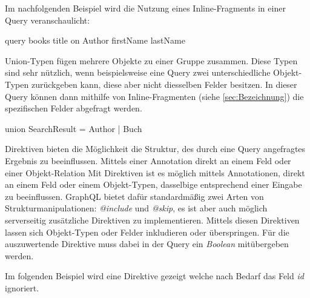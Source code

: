 Im nachfolgenden Beispiel wird die Nutzung eines Inline-Fragments in einer Query veranschaulicht:
\begin{JsCode}
query{
    books{
        title
        on Author{
            firstName
            lastName
        }
    }
}
\end{JsCode}

Union-Typen fügen mehrere Objekte zu einer Gruppe zusammen.
Diese Typen sind sehr nützlich, wenn beispielsweise eine Query zwei unterschiedliche Objekt-Typen zurückgeben kann, diese aber nicht diesselben Felder besitzen.
In dieser Query können dann mithilfe von Inline-Fragmenten (siehe \ref{sec:Bezeichnung}) die spezifischen Felder abgefragt werden.

\begin{JsCode}
union SearchResult = Author | Buch
\end{JsCode}

Direktiven bieten die Möglichkeit die Struktur, des durch eine Query angefragtes Ergebnis zu beeinflussen.
Mittels einer Annotation direkt an einem Feld oder einer Objekt-Relation
Mit Direktiven ist es möglich mittels Annotationen, direkt an einem Feld oder einem Objekt-Typen, dasselbige entsprechend einer Eingabe zu beeinflussen.
GraphQL bietet dafür standardmäßig zwei Arten von Strukturmanipulationen: \textit{@include} und \textit{@skip}, es ist aber auch möglich serverseitig zusätzliche Direktiven zu implementieren.
Mittels diesen Direktiven lassen sich Objekt-Typen oder Felder inkludieren oder überspringen.
Für die auszuwertende Direktive muss dabei in der Query ein \textit{Boolean} mitübergeben werden.

Im folgenden Beispiel wird eine Direktive gezeigt welche nach Bedarf das Feld \textit{id} ignoriert.



